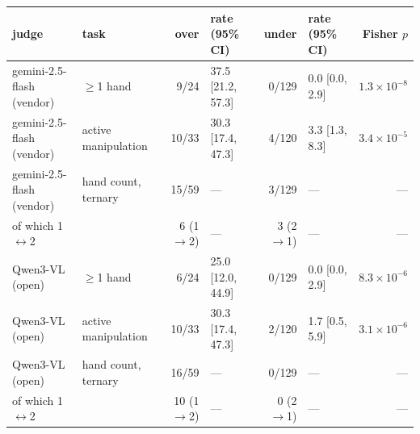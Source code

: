 \begin{tabular}{@{}llrlrlr@{}}
\toprule
judge & task & over & rate (95\% CI) & under & rate (95\% CI) & Fisher $p$ \\
\midrule
gemini-2.5-flash (vendor) & $\geq$1 hand & 9/24 & 37.5 [21.2, 57.3] & 0/129 & 0.0 [0.0, 2.9] & $1.3\times 10^{-8}$ \\
gemini-2.5-flash (vendor) & active manipulation & 10/33 & 30.3 [17.4, 47.3] & 4/120 & 3.3 [1.3, 8.3] & $3.4\times 10^{-5}$ \\
gemini-2.5-flash (vendor) & hand count, ternary & 15/59 & --- & 3/129 & --- & --- \\
\quad of which 1$\leftrightarrow$2 & & 6 (1$\to$2) & --- & 3 (2$\to$1) & --- & --- \\
\midrule
Qwen3-VL (open) & $\geq$1 hand & 6/24 & 25.0 [12.0, 44.9] & 0/129 & 0.0 [0.0, 2.9] & $8.3\times 10^{-6}$ \\
Qwen3-VL (open) & active manipulation & 10/33 & 30.3 [17.4, 47.3] & 2/120 & 1.7 [0.5, 5.9] & $3.1\times 10^{-6}$ \\
Qwen3-VL (open) & hand count, ternary & 16/59 & --- & 0/129 & --- & --- \\
\quad of which 1$\leftrightarrow$2 & & 10 (1$\to$2) & --- & 0 (2$\to$1) & --- & --- \\
\bottomrule
\end{tabular}
